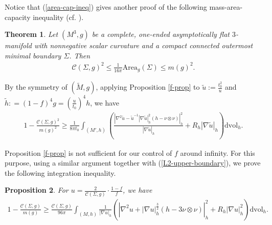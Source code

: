 \documentclass[letter]{amsart}
\newtheorem{thm}{Theorem}[section]
\newtheorem{prop}[thm]{Proposition}
\theoremstyle{definition}
\theoremstyle{remark}
\def\Area{\mathrm{Area}}
\begin{document}
Notice that (\ref{area-cap-ineq}) gives another proof of the following mass-area-capacity inequality (cf. \cite[Theorem 1]{BM08}).

\begin{thm}\label{mass-area-capacity}
Let $(M^3,g)$ be a complete, one-ended asymptotically flat $3$-manifold with
nonnegative scalar curvature and a compact connected outermost minimal boundary $\Sigma $. Then
	\begin{align}\label{m-a-c}
		 \mathcal{C}(\Sigma,g) ^2 \leq \frac{1}{16 \pi }\Area_g(\Sigma) \leq m(g)^2.
	\end{align}
\end{thm}

By the symmetry of $(\tilde{M}, g)$, applying Proposition \ref{f-prop} to $\tilde{u}:= \frac{t_0^2}{u}$ and $\tilde{h}: = (1-f)^{4} g = \left( \frac{u}{t_0} \right) ^{4} h$, we have
\begin{align}\label{M'-ineq}
	1- \frac{\mathcal{C}(\Sigma ,g)^2}{m(g)^2} \geq \frac{1}{8 \pi t_0} \int_{(M', h)}\left(  \frac{\left| \nabla ^2 \tilde{u} - \tilde{u} ^{-1} |\nabla \tilde{u}|_h^2 (h - \nu \otimes \nu ) \right|_h^2}{ |\nabla \tilde{u}|_h} + R_h |\nabla \tilde{u}|_h \right)  \mathrm{dvol}_h.
\end{align}


Proposition \ref{f-prop} is not sufficient for our control of $f$ around infinity. For this purpose, using a similar argument together with (\ref{L2-upper-boundary}), we prove the following integration inequality.
\begin{prop}\label{u-good}
	For $u = \frac{2}{\mathcal{C}(\Sigma ,g)} \cdot \frac{1-f}{f}$, we have
\begin{align}
	1 - \frac{\mathcal{C}(\Sigma ,g)}{m(g)} \geq \frac{\mathcal{C}(\Sigma ,g)}{96 \pi} \int_{(M,h)} \frac{1}{|\nabla u|_h}\left( \left|\nabla ^2 u + |\nabla u|_h^{\frac{3}{2}} (h - 3 \nu \otimes \nu )\right|_h^2 + R_h |\nabla u|_h^2 \right) \mathrm{dvol}_h.
\end{align}	
\end{prop}
\end{document}
